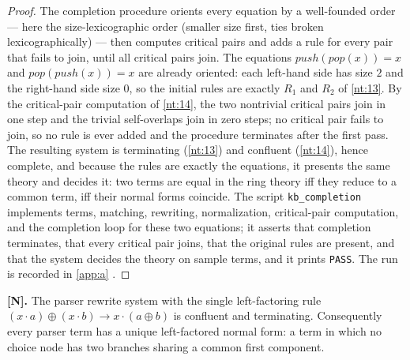 \begin{proof}
The completion procedure orients every equation by a well-founded order ---
here the size-lexicographic order (smaller size first, ties broken
lexicographically) --- then computes critical pairs and adds a rule for
every pair that fails to join, until all critical pairs join. The equations
$\mathit{push}(\mathit{pop}(x)) = x$ and
$\mathit{pop}(\mathit{push}(x)) = x$ are already oriented: each left-hand
side has size $2$ and the right-hand side size $0$, so the initial rules are
exactly $R_1$ and $R_2$ of \autoref{nt:13}. By the critical-pair computation
of \autoref{nt:14}, the two nontrivial critical pairs join in one step and
the trivial self-overlaps join in zero steps; no critical pair fails to
join, so no rule is ever added and the procedure terminates after the first
pass. The resulting system is terminating (\autoref{nt:13}) and confluent
(\autoref{nt:14}), hence complete, and because the rules are exactly the
equations, it presents the same theory and decides it: two terms are equal
in the ring theory iff they reduce to a common term, iff their normal forms
coincide. The script \texttt{kb\_completion} implements terms, matching,
rewriting, normalization, critical-pair computation, and the completion loop
for these two equations; it asserts that completion terminates, that every
critical pair joins, that the original rules are present, and that the
system decides the theory on sample terms, and it prints \texttt{PASS}. The
run is recorded in \autoref{app:a} \cite{knuthbendix}.
\end{proof}

\begin{theorem}\label{nt:16}
\textbf{[N].} The parser rewrite system with the single left-factoring rule
$(x \cdot a) \oplus (x \cdot b) \to x \cdot (a \oplus b)$ is confluent and
terminating. Consequently every parser term has a unique left-factored
normal form: a term in which no choice node has two branches sharing a
common first component.
\end{theorem}

